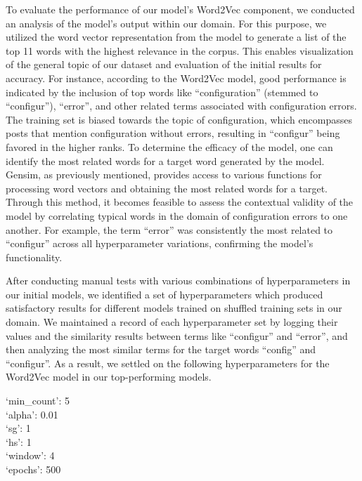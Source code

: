 \documentclass[english,bachelor]{swsLeipzig}
\begin{document}
To evaluate the performance of our model's Word2Vec component, we conducted an analysis of the model's output within 
our domain. For this purpose, we utilized the word vector representation from the model to generate a list of the top 11 words with the highest relevance in the corpus. This enables visualization of the general topic of our dataset and evaluation of the initial results for accuracy. For instance, according to the Word2Vec model, good performance is indicated by the inclusion of top words like ``configuration'' (stemmed to ``configur''), ``error'', and other related terms associated with configuration errors. The training set is biased towards the topic of configuration, which encompasses posts that mention configuration without errors, resulting in ``configur'' being favored in the higher ranks. To determine the efficacy of the model, one can identify the most related words for a target word generated by the model. Gensim, as previously mentioned, provides access to various functions for processing word vectors and obtaining the most related words for a target. Through this method, it becomes feasible to assess the contextual validity of the model by correlating typical words in the domain of configuration errors to one another. For example, the term ``error'' was consistently the most related to ``configur'' across all hyperparameter variations, confirming the model's functionality.

After conducting manual tests with various combinations of hyperparameters in our initial models, we identified a set 
of hyperparameters which produced satisfactory results for different models trained on shuffled training sets in our domain. We maintained a record of each hyperparameter set by logging their values and the similarity results between terms like ``configur'' and ``error'', and then analyzing the most similar terms for the target words ``config'' and ``configur''. As a result, we settled on the following hyperparameters for the Word2Vec model in our top-performing models.\\

\begin{adjustwidth}{1cm}{0cm}
`min\_count': 5\\
`alpha': 0.01\\
`sg': 1\\
`hs': 1\\
`window': 4\\
`epochs': 500\\
\end{adjustwidth}
\end{document}
